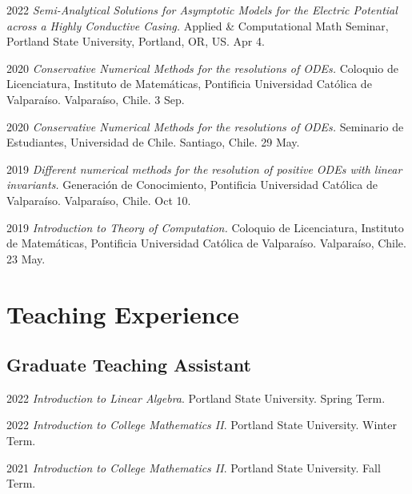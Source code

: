 \documentclass[12pt,letterpaper]{report}
\begin{document}
    \begin{tablist}

	\item[2022] \tab \emph{Semi-Analytical Solutions for Asymptotic Models for the Electric Potential across a Highly Conductive Casing.} Applied & Computational Math Seminar, Portland State University, Portland, OR, US. Apr 4.

        \item[2020] \tab \emph{Conservative Numerical Methods for the resolutions of ODEs.} Coloquio de Licenciatura, Instituto de Matem\'aticas, Pontificia Universidad Cat\'olica de Valpara\'iso. Valpara\'iso, Chile. 3 Sep.
         
        \item[2020] \tab \emph{Conservative Numerical Methods for the resolutions of ODEs.} Seminario de Estudiantes, Universidad de Chile. Santiago, Chile. 29 May.

    	\item[2019] \tab \emph{Different numerical methods for the resolution of positive ODEs with linear invariants.} Generaci\'on de Conocimiento, Pontificia Universidad Cat\'olica de Valpara\'iso. Valpara\'iso, Chile. Oct 10.
    
    	\item[2019] \tab \emph{Introduction to Theory of Computation.} Coloquio de Licenciatura, Instituto de Matem\'aticas, Pontificia Universidad Cat\'olica de Valpara\'iso. Valpara\'iso, Chile. 23 May.
    	
    \end{tablist}



    \section*{Teaching Experience}

    \subsection*{Graduate Teaching Assistant}

    \begin{tablist}

        \item[2022] \tab \emph{Introduction to Linear Algebra}. Portland State University. Spring Term. 
    
        \item[2022] \tab \emph{Introduction to College Mathematics II}. Portland State University. Winter Term. 

        \item[2021] \tab \emph{Introduction to College Mathematics II}. Portland State University. Fall Term. 

    \end{tablist}
\end{document}
